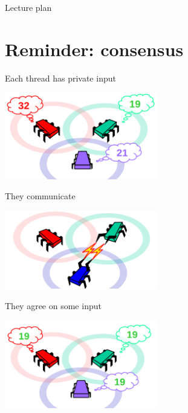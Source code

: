 \begin{frame}{Lecture plan}
\tableofcontents
\end{frame}

\section{Reminder: consensus}

\begin{frame}{Each thread has private input}
\begin{center}
  \includegraphics[width=0.5\textwidth]{./pics/consensus/cons1.png}
\end{center}
\end{frame}

\begin{frame}[noframenumbering]{They communicate}

\begin{center}
  \includegraphics[width=0.5\textwidth]{./pics/consensus/cons2.png}
\end{center}

\end{frame}

\begin{frame}[noframenumbering]{They agree on some input}

\begin{center}
  \includegraphics[width=0.5\textwidth]{./pics/consensus/cons3.png}
\end{center}
\end{frame}


